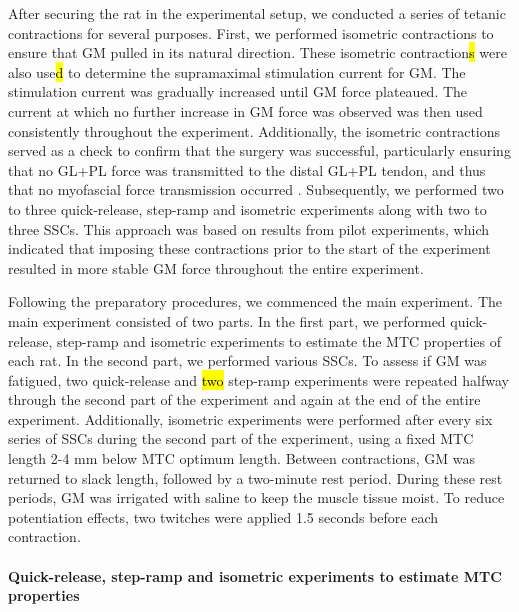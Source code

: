 \documentclass[
  10pt,
  letterpaper,
]{article}
\begin{document}
After securing the rat in the experimental setup, we conducted a series
of tetanic contractions for several purposes. First, we performed
isometric contractions to ensure that GM pulled in its natural
direction. These isometric contraction\hl{s} were also use\hl{d} to
determine the supramaximal stimulation current for GM. The stimulation
current was gradually increased until GM force plateaued. The current at
which no further increase in GM force was observed was then used
consistently throughout the experiment. Additionally, the isometric
contractions served as a check to confirm that the surgery was
successful, particularly ensuring that no GL+PL force was transmitted to
the distal GL+PL tendon, and thus that no myofascial force transmission
occurred \citep{finni_force_2023}. Subsequently, we performed two to
three quick-release, step-ramp and isometric experiments along with two
to three SSCs. This approach was based on results from pilot
experiments, which indicated that imposing these contractions prior to
the start of the experiment resulted in more stable GM force throughout
the entire experiment.

Following the preparatory procedures, we commenced the main experiment.
The main experiment consisted of two parts. In the first part, we
performed quick-release, step-ramp and isometric experiments to estimate
the MTC properties of each rat. In the second part, we performed various
SSCs. To assess if GM was fatigued, two quick-release and \hl{two}
step-ramp experiments were repeated halfway through the second part of
the experiment and again at the end of the entire experiment.
Additionally, isometric experiments were performed after every six
series of SSCs during the second part of the experiment, using a fixed
MTC length 2-4 mm below MTC optimum length. Between contractions, GM was
returned to slack length, followed by a two-minute rest period. During
these rest periods, GM was irrigated with saline to keep the muscle
tissue moist. To reduce potentiation effects, two twitches were applied
1.5 seconds before each contraction.

\paragraph{Quick-release, step-ramp and isometric experiments to
estimate MTC
properties}\label{quick-release-step-ramp-and-isometric-experiments-to-estimate-mtc-properties}
\end{document}
